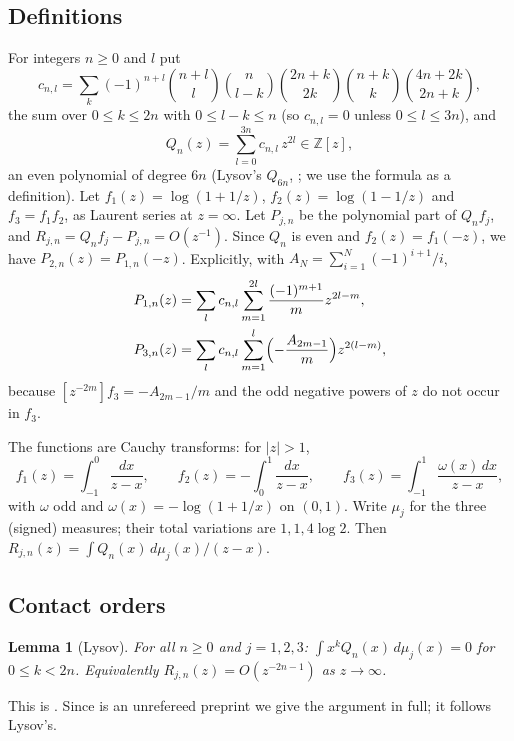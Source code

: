 \documentclass[11pt]{amsart}
\newtheorem{lemma}[proposition]{Lemma}
\theoremstyle{definition}
\theoremstyle{remark}
\numberwithin{equation}{section}
\newcommand{\ZZ}{\mathbb{Z}}
\begin{document}
\subsection{Definitions}
For integers $n\ge0$ and $l$ put
\[
c_{n,l}=\sum_k(-1)^{n+l}\binom{n+l}{l}\binom{n}{l-k}\binom{2n+k}{2k}\binom{n+k}{k}\binom{4n+2k}{2n+k},
\]
the sum over $0\le k\le2n$ with $0\le l-k\le n$ (so $c_{n,l}=0$ unless $0\le l\le3n$), and
\[
Q_n(z)=\sum_{l=0}^{3n}c_{n,l}\,z^{2l}\in\ZZ[z],
\]
an even polynomial of degree $6n$ (Lysov's $Q_{6n}$, \cite[formula~(21) and Lemma~8]{Lys18}; we use the formula as a
definition). Let $f_1(z)=\log(1+1/z)$, $f_2(z)=\log(1-1/z)$ and $f_3=f_1f_2$, as Laurent series at $z=\infty$. Let
$P_{j,n}$ be the polynomial part of $Q_nf_j$, and $R_{j,n}=Q_nf_j-P_{j,n}=O(z^{-1})$. Since $Q_n$ is even and
$f_2(z)=f_1(-z)$, we have $P_{2,n}(z)=P_{1,n}(-z)$. Explicitly, with $A_N=\sum_{i=1}^N(-1)^{i+1}/i$,
\begin{equation}\label{eq:P}
\begin{aligned}
P_{1,n}(z)&=\sum_lc_{n,l}\sum_{m=1}^{2l}\frac{(-1)^{m+1}}{m}z^{2l-m},\\
P_{3,n}(z)&=\sum_lc_{n,l}\sum_{m=1}^{l}\Bigl(-\frac{A_{2m-1}}m\Bigr)z^{2(l-m)},
\end{aligned}
\end{equation}
because $[z^{-2m}]f_3=-A_{2m-1}/m$ and the odd negative powers of $z$ do not occur in $f_3$.

The functions are Cauchy transforms: for $|z|>1$,
\[
f_1(z)=\int_{-1}^0\frac{dx}{z-x},\qquad f_2(z)=-\int_0^1\frac{dx}{z-x},\qquad
f_3(z)=\int_{-1}^1\frac{\omega(x)\,dx}{z-x},
\]
with $\omega$ odd and $\omega(x)=-\log(1+1/x)$ on $(0,1)$. Write $\mu_j$ for the three (signed) measures; their total
variations are $1,1,4\log2$. Then $R_{j,n}(z)=\int Q_n(x)\,d\mu_j(x)/(z-x)$.

\subsection{Contact orders}

\begin{lemma}[Lysov]\label{lem:contact}
For all $n\ge0$ and $j=1,2,3$: $\int x^kQ_n(x)\,d\mu_j(x)=0$ for $0\le k<2n$. Equivalently $R_{j,n}(z)=O(z^{-2n-1})$ as
$z\to\infty$.
\end{lemma}

This is \cite[Lemmas~7 and 8]{Lys18}. Since \cite{Lys18} is an unrefereed preprint we give the argument in full; it
follows Lysov's.
\end{document}
